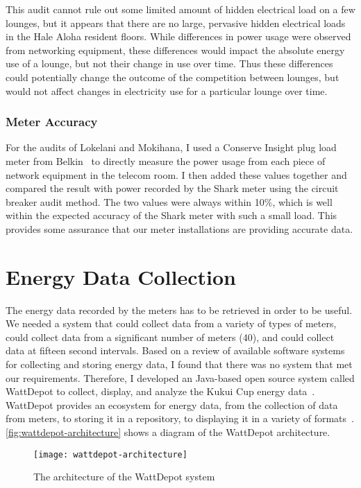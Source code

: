 This audit cannot rule out some limited amount of hidden electrical load on a few lounges, but it appears that there are no large, pervasive hidden electrical loads in the Hale Aloha resident floors. While differences in power usage were observed from networking equipment, these differences would impact the absolute energy use of a lounge, but not their change in use over time. Thus these differences could potentially change the outcome of the competition between lounges, but would not affect changes in electricity use for a particular lounge over time.


\subsubsection{Meter Accuracy}

For the audits of Lokelani and Mokihana, I used a Conserve Insight plug load meter from Belkin~\cite{belkin-insight} to directly measure the power usage from each piece of network equipment in the telecom room. I then added these values together and compared the result with power recorded by the Shark meter using the circuit breaker audit method. The two values were always within 10\%, which is well within the expected accuracy of the Shark meter with such a small load. This provides some assurance that our meter installations are providing accurate data.


\section{Energy Data Collection}
\label{sec:energy-data-collection}

The energy data recorded by the meters has to be retrieved in order to be useful. We needed a system that could collect data from a variety of types of meters, could collect data from a significant number of meters (40), and could collect data at fifteen second intervals. Based on a review of available software systems for collecting and storing energy data, I found that there was no system that met our requirements. Therefore, I developed an Java-based open source system called WattDepot to collect, display, and analyze the Kukui Cup energy data~\cite{csdl2-10-05}. WattDepot provides an ecosystem for energy data, from the collection of data from meters, to storing it in a repository, to displaying it in a variety of formats~\cite{WattDepot}. \autoref{fig:wattdepot-architecture} shows a diagram of the WattDepot architecture.

\begin{figure}[htbp]
	\centering
		\texttt{[image: wattdepot-architecture]}
		\caption{The architecture of the WattDepot system}
\label{fig:wattdepot-architecture}
\end{figure}

